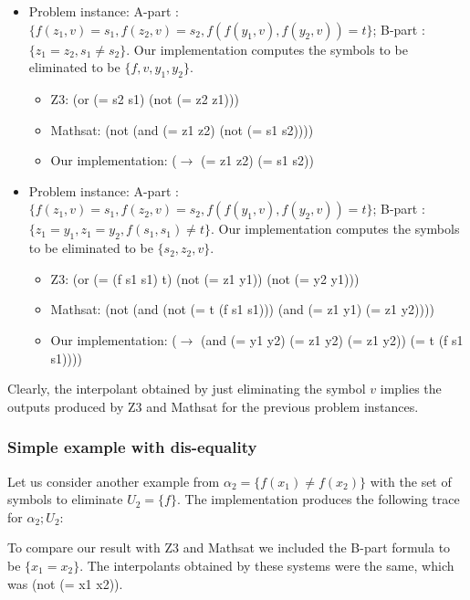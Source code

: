 \begin{itemize}
  \item Problem instance: A-part : $\{f(z_1, v) = s_1, f(z_2, v) 
    = s_2, f(f(y_1, v), f(y_2, v)) = t\}$; B-part : 
    $\{z_1 = z_2, s_1 \neq s_2 \}$. Our implementation
    computes the symbols to be eliminated to be $\{f, v, y_1, y_2\}$.
    \begin{itemize}
      \item Z3: (or (= s2 s1) (not (= z2 z1)))
      \item Mathsat: (not (and (= z1 z2) (not (= s1 s2))))
      \item Our implementation: ($\rightarrow$ (= z1 z2) (= s1 s2))
    \end{itemize}

  \item Problem instance: A-part : $\{f(z_1, v) = s_1, f(z_2, v) 
    = s_2, f(f(y_1, v), f(y_2, v)) = t\}$; 
    B-part : $\{z_1 = y_1, z_1 = y_2, f(s_1, s_1) \neq t\}$.
    Our implementation
    computes the symbols to be eliminated to be $\{s_2, z_2, v\}$.

    \begin{itemize}
      \item Z3: (or (= (f s1 s1) t) (not (= z1 y1)) (not (= y2 y1)))
      \item Mathsat: (not (and (not (= t (f s1 s1))) (and (= z1 y1) (= z1 y2))))
      \item Our implementation: ($\rightarrow$ (and (= y1 y2) (= z1 y2) (= z1 y2)) (= t (f s1 s1))))
  \end{itemize}

\end{itemize}

Clearly, the interpolant obtained by just eliminating the symbol $v$ implies
the outputs produced by Z3 and Mathsat for the previous problem instances.

\subsubsection{Simple example with dis-equality}

Let us consider another example from \cite{KAPUR2017} 
$\alpha_2 = \{f(x_1) \neq f(x_2)\}$
with the set of symbols to eliminate $U_2 = \{f\}$. The implementation produces the following
trace for $\alpha_2; U_2$:



To compare our result with Z3 and Mathsat we 
included the B-part formula to be $\{x_1 = x_2\}$.
The interpolants obtained by these systems were the 
same, which was (not (= x1 x2)).





